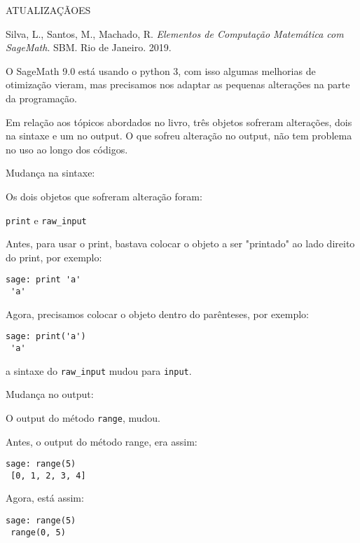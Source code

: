 \documentclass[10pt,a4paper]{report}
\begin{document}
\thispagestyle{empty}










\begin{center}
ATUALIZAÇÃOES 
\end{center}

\noindent
Silva, L., Santos, M., Machado, R. \textit{Elementos de Computação Matemática com SageMath}. SBM. Rio de Janeiro. 2019.


\vspace{1cm}

O SageMath 9.0 está usando o python 3, com isso algumas melhorias de otimização vieram, mas precisamos nos adaptar as pequenas alterações na parte da programação.

Em relação aos tópicos abordados no livro, três objetos sofreram alterações, dois na sintaxe e um no output. O que sofreu alteração no output, não tem problema no uso ao longo dos códigos.

Mudança na sintaxe:


Os dois objetos que sofreram alteração foram:

\verb|print| e \verb|raw_input|

Antes, para usar o print, bastava colocar o objeto a ser "printado" ao lado direito do print, por exemplo:
\begin{lstlisting}[frame=e, numbers=none, xleftmargin=0em]
sage: print 'a'
 'a'
\end{lstlisting}

Agora, precisamos colocar o objeto dentro do parênteses, por exemplo:
\begin{lstlisting}[frame=e, numbers=none, xleftmargin=0em]
sage: print('a')
 'a' 
\end{lstlisting}

a sintaxe do \verb|raw_input| mudou para \verb|input|.

Mudança no output:


O output do método \verb|range|, mudou.

Antes, o output do método range, era assim:
\begin{lstlisting}[frame=e, numbers=none, xleftmargin=0em]
sage: range(5)
 [0, 1, 2, 3, 4]
\end{lstlisting}

Agora, está assim:
\begin{lstlisting}[frame=e, numbers=none, xleftmargin=0em]
sage: range(5)
 range(0, 5)
\end{lstlisting}
\end{document}
